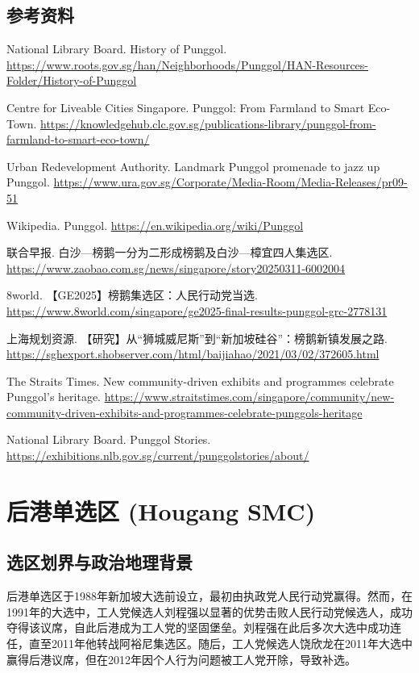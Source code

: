 \documentclass[11pt,a4paper,twoside,openany]{book}
\begin{document}
\section*{参考资料}
\begin{enumerate}[label={[\arabic*]},leftmargin=*,topsep=2pt,itemsep=1pt,parsep=0pt]
  \item National Library Board. History of Punggol. \url{https://www.roots.gov.sg/han/Neighborhoods/Punggol/HAN-Resources-Folder/History-of-Punggol}
  \item Centre for Liveable Cities Singapore. Punggol: From Farmland to Smart Eco-Town. \url{https://knowledgehub.clc.gov.sg/publications-library/punggol-from-farmland-to-smart-eco-town/}
  \item Urban Redevelopment Authority. Landmark Punggol promenade to jazz up Punggol. \url{https://www.ura.gov.sg/Corporate/Media-Room/Media-Releases/pr09-51}
  \item Wikipedia. Punggol. \url{https://en.wikipedia.org/wiki/Punggol}
  \item 联合早报. 白沙—榜鹅一分为二形成榜鹅及白沙—樟宜四人集选区. \url{https://www.zaobao.com.sg/news/singapore/story20250311-6002004}
  \item 8world. 【GE2025】榜鹅集选区：人民行动党当选. \url{https://www.8world.com/singapore/ge2025-final-results-punggol-grc-2778131}
  \item 上海规划资源. 【研究】从“狮城威尼斯”到“新加坡硅谷”：榜鹅新镇发展之路. \url{https://sghexport.shobserver.com/html/baijiahao/2021/03/02/372605.html}
  \item The Straits Times. New community-driven exhibits and programmes celebrate Punggol’s heritage. \url{https://www.straitstimes.com/singapore/community/new-community-driven-exhibits-and-programmes-celebrate-punggols-heritage}
  \item National Library Board. Punggol Stories. \url{https://exhibitions.nlb.gov.sg/current/punggolstories/about/}
\end{enumerate}

\chapter{后港单选区 (Hougang SMC)}

\section{选区划界与政治地理背景}
后港单选区于1988年新加坡大选前设立，最初由执政党人民行动党赢得。然而，在1991年的大选中，工人党候选人刘程强以显著的优势击败人民行动党候选人，成功夺得该议席，自此后港成为工人党的坚固堡垒。刘程强在此后多次大选中成功连任，直至2011年他转战阿裕尼集选区。随后，工人党候选人饶欣龙在2011年大选中赢得后港议席，但在2012年因个人行为问题被工人党开除，导致补选。
\end{document}
